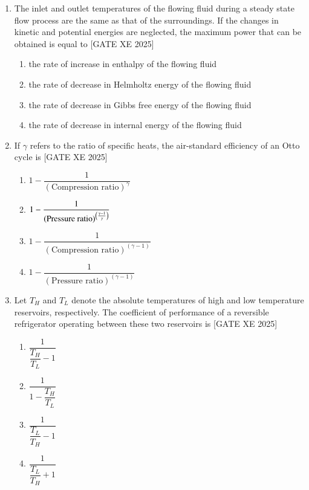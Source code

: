 \documentclass[journal,12pt,onecolumn]{IEEEtran}
\theoremstyle{remark}
\begin{document}
\begin{enumerate}
\item The inlet and outlet temperatures of the flowing fluid during a steady state flow process are the same as that of the surroundings. If the changes in kinetic and potential energies are neglected, the maximum power that can be obtained is equal to
\hfill[GATE XE 2025]
\begin{multicols}{2}
\begin{enumerate}
\item the rate of increase in enthalpy of the flowing fluid
\item the rate of decrease in Helmholtz energy of the flowing fluid
\item the rate of decrease in Gibbs free energy of the flowing fluid
\item the rate of decrease in internal energy of the flowing fluid
\end{enumerate}
\end{multicols}

\item If $\gamma$ refers to the ratio of specific heats, the air-standard efficiency of an Otto cycle is
\hfill[GATE XE 2025]
\begin{multicols}{2}
\begin{enumerate}
\item $1-\dfrac{1}{(\text{Compression ratio})^{\gamma}}$
\item $1-\dfrac{1}{(\text{Pressure ratio})^{\left(\frac{\gamma-1}{\gamma}\right)}}$
\item $1-\dfrac{1}{(\text{Compression ratio})^{(\gamma-1)}}$
\item $1-\dfrac{1}{(\text{Pressure ratio})^{(\gamma-1)}}$
\end{enumerate}
\end{multicols}

\item Let $T_H$ and $T_L$ denote the absolute temperatures of high and low temperature reservoirs, respectively. The coefficient of performance of a reversible refrigerator operating between these two reservoirs is
\hfill[GATE XE 2025]
\begin{multicols}{2}
\begin{enumerate}
\item $\dfrac{1}{\dfrac{T_H}{T_L}-1}$
\item $\dfrac{1}{1-\dfrac{T_H}{T_L}}$
\item $\dfrac{1}{\dfrac{T_L}{T_H}-1}$
\item $\dfrac{1}{\dfrac{T_L}{T_H}+1}$
\end{enumerate}
\end{multicols}


\end{enumerate}
\end{document}
